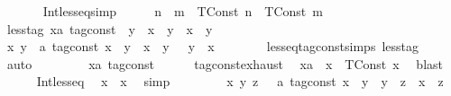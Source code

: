 \begin{isabellebody}
\ \ \isanewline
\ \ \ \ Int{\isacharunderscore}less{\isacharunderscore}eq{\isacharbrackleft}simp{\isacharbrackright}{\isacharcolon}\ \ \ \ \ \ {\isacartoucheopen}n\ {\isasymle}\ m\ {\isasymLongrightarrow}\ {\isacharparenleft}TConst\ n{\isacharparenright}\ {\isasymle}\ {\isacharparenleft}TConst\ m{\isacharparenright}{\isacartoucheclose}\isanewline
\isanewline
\ \ \isamarkupfalse%
\ less{\isacharunderscore}tag{\isacharcolon}\ {\isacartoucheopen}{\isacharparenleft}x{\isacharcolon}{\isacharcolon}{\isacharprime}a\ tag{\isacharunderscore}const{\isacharparenright}\ {\isacharless}\ y\ {\isasymlongleftrightarrow}\ {\isacharparenleft}x\ {\isasymle}\ y{\isacharparenright}\ {\isasymand}\ {\isacharparenleft}x\ {\isasymnoteq}\ y{\isacharparenright}{\isacartoucheclose}\isanewline
\isanewline
\ \ \isamarkupfalse%
%
\isadelimproof
\ %
\endisadelimproof
%
\isatagproof
{}\isamarkupfalse%
\isanewline
\ \ \ \ \isamarkupfalse%
\ {\isacartoucheopen}{\isasymAnd}x\ y\ {\isacharcolon}{\isacharcolon}\ {\isacharprime}a\ tag{\isacharunderscore}const{\isachardot}\ {\isacharparenleft}x\ {\isacharless}\ y{\isacharparenright}\ {\isacharequal}\ {\isacharparenleft}x\ {\isasymle}\ y\ {\isasymand}\ {\isasymnot}\ y\ {\isasymle}\ x{\isacharparenright}{\isacartoucheclose}\isanewline
\ \ \ \ \ \ \isamarkupfalse%
\ less{\isacharunderscore}eq{\isacharunderscore}tag{\isacharunderscore}const{\isachardot}simps\ less{\isacharunderscore}tag\ \isamarkupfalse%
\ auto\isanewline
\ \ \isamarkupfalse%
\isanewline
\ \ \ \ \isamarkupfalse%
\ x{\isacharcolon}{\isacharcolon}{\isacartoucheopen}{\isacharprime}a\ tag{\isacharunderscore}const{\isacartoucheclose}\isanewline
\ \ \ \ \isamarkupfalse%
\ tag{\isacharunderscore}const{\isachardot}exhaust\ \isamarkupfalse%
\ xa\ \ {\isacartoucheopen}x\ {\isacharequal}\ TConst\ x\ \isamarkupfalse%
\ blast\isanewline
\ \ \ \ \isamarkupfalse%
\ Int{\isacharunderscore}less{\isacharunderscore}eq\ \isamarkupfalse%
\ {\isacartoucheopen}x\ {\isasymle}\ x{\isacartoucheclose}\ \isamarkupfalse%
\ simp\isanewline
\ \ \isamarkupfalse%
\isanewline
\ \ \ \ \isamarkupfalse%
\ {\isacartoucheopen}{\isasymAnd}x\ y\ z\ \ {\isacharcolon}{\isacharcolon}\ {\isacharprime}a\ tag{\isacharunderscore}const{\isachardot}\ x\ {\isasymle}\ y\ {\isasymLongrightarrow}\ y\ {\isasymle}\ z\ {\isasymLongrightarrow}\ x\ {\isasymle}\ z{\isacartoucheclose}\isanewline

\end{isabellebody}
